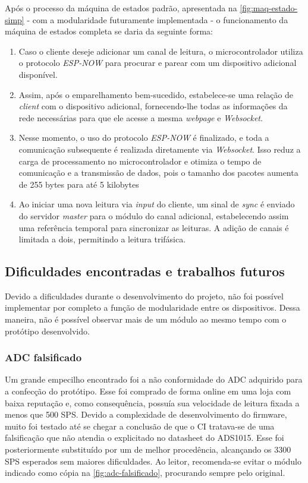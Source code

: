 Após o processo da máquina de estados padrão, apresentada na \autoref{fig:maq-estado-simp} - com a modularidade futuramente implementada - o funcionamento da máquina de estados completa se daria da seguinte forma:
\begin{enumerate}
    \item Caso o cliente deseje adicionar um canal de leitura, o microcontrolador utiliza o protocolo \textit{ESP-NOW} para procurar e parear com um dispositivo adicional disponível.
    
    \item Assim, após o emparelhamento bem-sucedido, estabelece-se uma relação de \textit{client} com o dispositivo adicional, fornecendo-lhe todas as informações da rede necessárias para que ele acesse a mesma \textit{webpage} e \textit{Websocket}.
    
    \item Nesse momento, o uso do protocolo \textit{ESP-NOW} é finalizado, e toda a comunicação subsequente é realizada diretamente via \textit{Websocket}. Isso reduz a carga de processamento no microcontrolador e otimiza o tempo de comunicação e a transmissão de dados, pois o tamanho dos pacotes aumenta de 255 bytes para até 5 kilobytes
    
    \item Ao iniciar uma nova leitura via \textit{input} do cliente, um sinal de \textit{sync} é enviado do servidor \textit{master} para o módulo do canal adicional, estabelecendo assim uma referência temporal para sincronizar as leituras. A adição de canais é limitada a dois, permitindo a leitura trifásica.
\end{enumerate}

\subsection{Dificuldades encontradas e trabalhos futuros}\label{dificuldades-futuro}

Devido a dificuldades durante o desenvolvimento do projeto, não foi possível implementar por completo a função de modularidade entre os dispositivos. Dessa maneira, não é possível observar mais de um módulo ao mesmo tempo com o protótipo desenvolvido.

\subsubsection{ADC falsificado}\label{adc-falso}

Um grande empecilho encontrado foi a não conformidade do \gls{ADC} adquirido para a confecção do protótipo. Esse foi comprado de forma online em uma loja com baixa reputação e, como consequência, possuía sua velocidade de leitura fixada a menos que 500 \gls{SPS}. Devido a complexidade de desenvolvimento do firmware, muito foi testado até se chegar a conclusão de que o CI tratava-se de uma falsificação que não atendia o explicitado no datasheet do ADS1015. Esse foi posteriormente substituído por um de melhor procedência, alcançando os 3300 \gls{SPS} esperados sem maiores dificuldades.
Ao leitor, recomenda-se evitar o módulo indicado como cópia na \autoref{fig:adc-falsificado}, procurando sempre pelo original.

